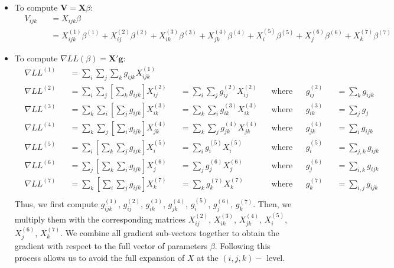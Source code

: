 \documentclass[12pt]{article}
\begin{document}
\begin{itemize}
\item To compute $\textbf{V} = \textbf{X}\beta$:
\begin{equation}
\begin{aligned}
	& V_{ijk} && = X_{ijk} \beta \\
	& && = X^{(1)}_{ijk} \beta^{(1)} + X^{(2)}_{ij} \beta^{(2)} + X^{(3)}_{ik} \beta^{(3)} + X^{(4)}_{jk} \beta^{(4)} + X^{(5)}_{i} \beta^{(5)} + X^{(6)}_{j} \beta^{(6)} + X^{(7)}_{k} \beta^{(7)} 
\end{aligned}
\end{equation}

\item To compute $\nabla LL(\beta) = \textbf{X}' \textbf{g}$:
	\begin{equation}
	\begin{aligned}
		& \nabla LL^{(1)} && = \sum_{i} \sum_{j} \sum_{k} g_{ijk} X^{(1)}_{ijk}		  \\
		& \nabla LL^{(2)} && = \sum_{i} \sum_{j} \left[\sum_{k} g_{ijk} \right] X^{(2)}_{ij}		&& = \sum_{i} \sum_{j} g^{(2)}_{ij} X^{(2)}_{ij}	&& \text{where} && g^{(2)}_{ij} && = \sum_{k} g_{ijk}  \\
		& \nabla LL^{(3)} && = \sum_{k} \sum_{i} \left[ \sum_{j} g_{ijk} \right] X^{(3)}_{ik}	&& = \sum_{k} \sum_{i} g^{(3)}_{ik} X^{(3)}_{ik}	&& \text{where} && g^{(3)}_{ik} && = \sum_{j} g_{j}  \\		
		& \nabla LL^{(4)} && = \sum_{k} \sum_{j} \left[ \sum_{i}  g_{ijk} \right] X^{(4)}_{jk}	&& = \sum_{k} \sum_{j} g^{(4)}_{jk} X^{(4)}_{jk}	&& \text{where} && g^{(4)}_{jk} && = \sum_{i} g_{ijk}  \\
		& \nabla LL^{(5)} && = \sum_{i} \left[ \sum_{k} \sum_{j} g_{ijk} \right] X^{(5)}_{i}		&& = \sum_{i}  g^{(5)}_{i} X^{(5)}_{i}				&& \text{where} && g^{(5)}_{i} && = \sum_{j,k} g_{ijk}  \\
		& \nabla LL^{(6)} && = \sum_{j} \left[ \sum_{k} \sum_{i} g_{ijk} \right] X^{(6)}_{j}		&& = \sum_{j} g^{(6)}_{j} X^{(6)}_{j}			&& \text{where} && g^{(6)}_{j} && = \sum_{i,k} g_{ijk}  \\		& \nabla LL^{(7)} && = \sum_{k} \left[ \sum_{i} \sum_{j} g_{ijk} \right] X^{(7)}_{k}		&& = \sum_{k}  g^{(7)}_{k} X^{(7)}_{k}				&& \text{where} && g^{(7)}_{k} && = \sum_{i,j} g_{ijk}  \\
	\end{aligned}
	\end{equation}
	Thus, we first compute $g^{(1)}_{ijk}$, $g^{(2)}_{ij}$, $g^{(3)}_{ik}$, $g^{(4)}_{jk}$, $g^{(5)}_{i}$, $g^{(6)}_{j}$, $g^{(7)}_{k}$. Then, we multiply them with the corresponding matrices $X^{(2)}_{ij}$, $X^{(3)}_{ik}$, $X^{(4)}_{jk}$, $X^{(5)}_{i}$, $X^{(6)}_{j}$, $X^{(7)}_{k}$. We combine all gradient sub-vectors together to obtain the gradient with respect to the full vector of parameters $\beta$. Following this process allows us to avoid the full expansion of $X$ at the $(i,j,k)-$ level.


\end{itemize}
\end{document}
